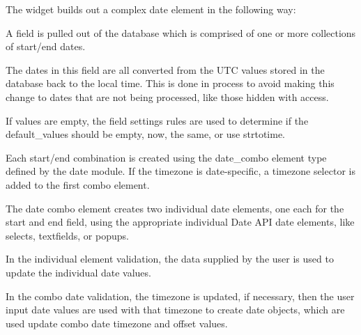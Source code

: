 The widget builds out a complex date element in the following way:


\begin{DoxyItemize}
\item A field is pulled out of the database which is comprised of one or more collections of start/end dates.
\end{DoxyItemize}


\begin{DoxyItemize}
\item The dates in this field are all converted from the UTC values stored in the database back to the local time. This is done in process to avoid making this change to dates that are not being processed, like those hidden with access.
\end{DoxyItemize}


\begin{DoxyItemize}
\item If values are empty, the field settings rules are used to determine if the default\_\-values should be empty, now, the same, or use strtotime.
\end{DoxyItemize}


\begin{DoxyItemize}
\item Each start/end combination is created using the date\_\-combo element type defined by the date module. If the timezone is date-\/specific, a timezone selector is added to the first combo element.
\end{DoxyItemize}


\begin{DoxyItemize}
\item The date combo element creates two individual date elements, one each for the start and end field, using the appropriate individual Date API date elements, like selects, textfields, or popups.
\end{DoxyItemize}


\begin{DoxyItemize}
\item In the individual element validation, the data supplied by the user is used to update the individual date values.
\end{DoxyItemize}


\begin{DoxyItemize}
\item In the combo date validation, the timezone is updated, if necessary, then the user input date values are used with that timezone to create date objects, which are used update combo date timezone and offset values.
\end{DoxyItemize}


